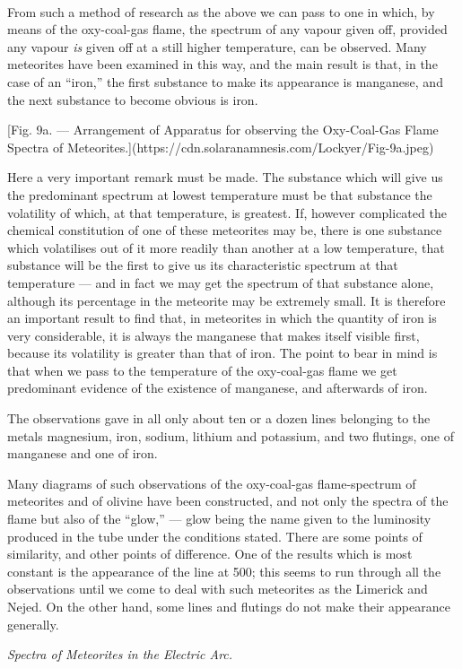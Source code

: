 \documentclass[a4paper, 12pt, oneside, polutonikogreek, english]{article}
\begin{document}
\paragraph{}
From such a method of research as the above we can pass to one in which, by means of the oxy-coal-gas flame, the spectrum of any vapour given off, provided any vapour \emph{is} given off at a still higher temperature, can be observed. Many meteorites have been examined in this way, and the main result is that, in the case of an ``iron,'' the first substance to make its appearance is manganese, and the next substance to become obvious is iron.

[Fig. 9a. --- Arrangement of Apparatus for observing the Oxy-Coal-Gas Flame Spectra of Meteorites.](https://cdn.solaranamnesis.com/Lockyer/Fig-9a.jpeg)

Here a very important remark must be made. The substance which will give us the predominant spectrum at lowest temperature must be that substance the volatility of which, at that temperature, is greatest. If, however complicated the chemical constitution of one of these meteorites may be, there is one substance which volatilises out of it more readily than another at a low temperature, that substance will be the first to give us its characteristic spectrum at that temperature --- and in fact we may get the spectrum of that substance alone, although its percentage in the meteorite may be extremely small. It is therefore an important result to find that, in meteorites in which the quantity of iron is very considerable, it is always the manganese that makes itself visible first, because its volatility is greater than that of iron. The point to bear in mind is that when we pass to the temperature of the oxy-coal-gas flame we get predominant evidence of the existence of manganese, and afterwards of iron.

The observations gave in all only about ten or a dozen lines belonging to the metals magnesium, iron, sodium, lithium and potassium, and two flutings, one of manganese and one of iron.

Many diagrams of such observations of the oxy-coal-gas flame-spectrum of meteorites and of olivine have been constructed, and not only the spectra of the flame but also of the ``glow,'' --- glow being the name given to the luminosity produced in the tube under the conditions stated. There are some points of similarity, and other points of difference. One of the results which is most constant is the appearance of the line at 500; this seems to run through all the observations until we come to deal with such meteorites as the Limerick and Nejed. On the other hand, some lines and flutings do not make their appearance generally.
\begin{center}
\emph{Spectra of Meteorites in the Electric Arc.}
\end{center}
\end{document}
